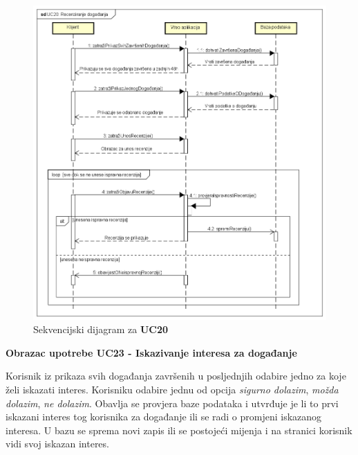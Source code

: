 	\begin{figure}[H]
		\includegraphics[width=\textwidth]{dijagrami/sd2.PNG}
		\centering
		\caption{Sekvencijski dijagram za \textbf{UC20}}
		\label{fig:promjene}
	\end{figure}
	
	\newpage
	
	\noindent \textbf{Obrazac upotrebe UC23 - Iskazivanje interesa za događanje}
	
	\noindent Korisnik iz prikaza svih događanja završenih u posljednjih odabire jedno za koje želi iskazati interes. Korisniku odabire jednu od opcija \textit{sigurno dolazim}, \textit{možda dolazim}, \textit{ne dolazim}. Obavlja se provjera baze podataka i utvrđuje je li to prvi iskazani interes tog korisnika za događanje ili se radi o promjeni iskazanog interesa. U bazu se sprema novi zapis ili se postojeći mijenja i na stranici korisnik vidi svoj iskazan interes.
	
